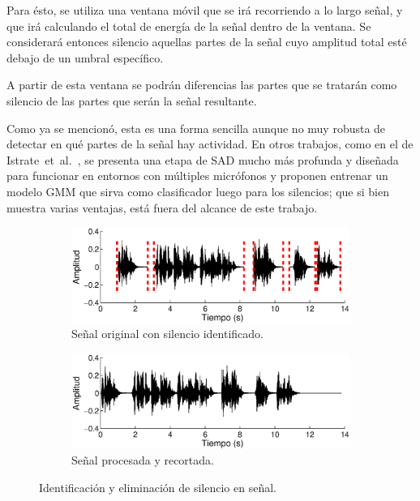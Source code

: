 Para ésto, se utiliza una ventana móvil que se irá recorriendo a lo largo señal, y que irá calculando el total de energía de la señal dentro de la ventana. Se considerará entonces silencio aquellas partes de la señal cuyo amplitud total esté debajo de un umbral específico.

A partir de esta ventana se podrán diferencias las partes que se tratarán como silencio de las partes que serán la señal resultante.

Como ya se mencionó, esta es una forma sencilla aunque no muy robusta de detectar en qué partes de la señal hay actividad. En otros trabajos, como 
en el de Istrate~et~al.~\cite{Istrate2005}, se presenta una etapa de \ac{SAD} mucho más profunda y diseñada para funcionar en entornos con múltiples micrófonos y proponen entrenar un modelo \ac{GMM} que sirva como clasificador luego para los silencios; que si bien muestra varias ventajas, está fuera del alcance de este trabajo.

\begin{figure}[ht]
  \begin{subfigure}[b]{\textwidth}
    \includegraphics[width=0.9\linewidth]{gfx/chap2/signal1}
    \caption{Señal original con silencio identificado.}
    \label{fig:sign_silence}  
  \end{subfigure}

  \begin{subfigure}[b]{\textwidth}
    \includegraphics[width=0.9\linewidth]{gfx/chap2/signal2}
    \caption{Señal procesada y recortada.}
    \label{fig:sign_trunc}  
  \end{subfigure}
  
  \caption[Identificación/eliminación de silencios.]{Identificación y eliminación de silencio en señal.}  
  \label{fig:sign_ident}  
\end{figure}

